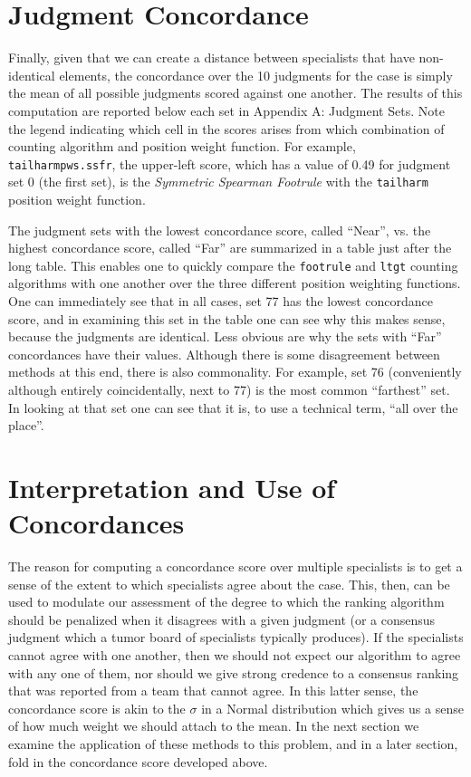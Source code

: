 \documentclass{article}
\begin{document}
\section{Judgment Concordance} 

Finally, given that we can create a distance between specialists that have non-identical elements, the concordance over the 10 judgments for the case is simply the mean of all possible judgments scored against one another. The results of this computation are reported below each set in Appendix A: Judgment Sets. Note the legend indicating which cell in the scores arises from which combination of counting algorithm and position weight function. For example, \texttt{tailharmpws.ssfr}, the upper-left score, which has a value of 0.49 for judgment set 0 (the first set), is the \emph{Symmetric Spearman Footrule} with the \texttt{tailharm} position weight function.

The judgment sets with the lowest concordance score, called ``Near'', vs. the highest concordance score, called ``Far'' are summarized in a table just after the long table. This enables one to quickly compare the \texttt{footrule} and \texttt{ltgt} counting algorithms with one another over the three different position weighting functions. One can immediately see that in all cases, set 77 has the lowest concordance score, and in examining this set in the table one can see why this makes sense, because the judgments are identical. Less obvious are why the sets with ``Far'' concordances have their values. Although there is some disagreement between methods at this end, there is also commonality. For example, set 76 (conveniently although entirely coincidentally, next to 77) is the most common ``farthest'' set. In looking at that set one can see that it is, to use a technical term, ``all over the place''. 

\section{Interpretation and Use of Concordances}

The reason for computing a concordance score over multiple specialists is to get a sense of the extent to which specialists agree about the case. This, then, can be used to modulate our assessment of the degree to which the ranking algorithm should be penalized when it disagrees with a given judgment (or a consensus judgment which a tumor board of specialists typically produces). If the specialists cannot agree with one another, then we should not expect our algorithm to agree with any one of them, nor should we give strong credence to a consensus ranking that was reported from a team that cannot agree. In this latter sense, the concordance score is akin to the $\sigma$ in a Normal distribution which gives us a sense of how much weight we should attach to the mean. In the next section we examine the application of these methods to this problem, and in a later section, fold in the concordance score developed above. 
\end{document}
